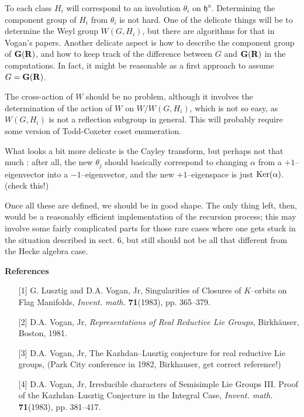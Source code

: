 \documentclass[11 pt]{article}
\def\a{\alpha}
\def\G{{\bf G}}
\def\hf{{\mathfrak h}}
\def\Ker{{\rm Ker}}
\def\R{{\bf R}}
\def\t{\theta}
\begin{document}
To each class $H_i$ will correspond to an involution $\t_i$ on $\hf^a$.
Determining the component group of $H_i$ from $\t_i$ is not hard.
One of the delicate things will be to determine the Weyl group $W(G,H_i)$,
but there are algorithms for that in Vogan's papers.
Another delicate aspect is how to describe the component
group of $\G(\R)$, and how to keep track of the difference between $G$ and
$\G(\R)$ in the computations. In fact, it might be reasonable as a first
approach to assume $G=\G(\R)$.

The cross-action of $W$ should be no problem, although it involves the
determination of the action of $W$ on $W/W(G,H_i)$, which is not so easy,
as $W(G,H_i)$ is not a reflection subgroup in general. This will probably
require some version of Todd-Coxeter coset enumeration.

What looks a bit more delicate
is the Cayley transform, but perhaps not that much : after all, the new $\t_j$
should basically correspond to changing $\a$ from a $+1$--eigenvector into
a $-1$--eigenvector, and the new $+1$--eigenspace is just $\Ker(\a)$. (check
this!)

Once all these are defined, we should be in good shape. The only thing left,
then, would be a reasonably efficient implementation of the recursion process;
this may involve some fairly complicated parts for those rare cases where
one gets stuck in the situation described in sect. 6, but still should not
be all that different from the Hecke algebra case.

\bigskip

\noindent\textbf{References}

\begin{itemize} pt
\item[{[1]}]G. Lusztig and D.A. Vogan, Jr, Singularities of Closures of
$K$--orbits on Flag Manifolds, {\it Invent. math.} {\bf 71}(1983), pp.
365--379.
\item[{[2]}]D.A. Vogan, Jr, {\it Representations of Real Reductive Lie Groups},
Birkh\"auser, Boston, 1981.
\item[{[3]}]D.A. Vogan, Jr, The Kazhdan--Lusztig conjecture for real reductive
Lie groups, (Park City conference in 1982, Birkhauser, get correct reference!)
\item[{[4]}]D.A. Vogan, Jr, Irreducible characters of Semisimple Lie Groups
III. Proof of the Kazhdan--Lusztig Conjecture in the Integral Case, {\it
Invent. math.} {\bf 71}(1983), pp. 381--417.
\end{itemize}
\end{document}

